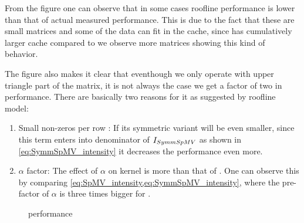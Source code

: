  From the figure one can observe that in some cases roofline performance is lower than that of actual measured performance. This is due to the fact that these are small matrices and some of the data can fit in the cache, since \SKX has cumulatively larger cache compared to \IVB we observe more matrices showing this kind of behavior.
 
 The figure also makes it clear that eventhough we only operate with upper triangle part of the matrix, it is not always the case we get a factor of two in performance. There are basically two reasons for it as suggested by roofline model:
 \begin{enumerate}
 	\item Small non-zeros per row \NNZR: If \NNZR its symmetric variant \NNZRSYMM will be even smaller, since this term enters into denominator of $I_{SymmSpMV}$ as shown in \cref{eq:SymmSpMV_intensity} it decreases the performance even more.
 	\item $\alpha$ factor: The effect of $\alpha$ on \SymmSpmv kernel is more than that of \SpMV. One can observe this by comparing \cref{eq:SpMV_intensity,eq:SymmSpMV_intensity}, where the  pre-factor of $\alpha$ is three times bigger for \SymmSpmv.
 \end{enumerate}

\begin{figure}[thbp]
	\centering
	\hspace{1em}
	\caption{\SymmSpmv performance}
	\label{fig:symm_spmv}
\end{figure}

